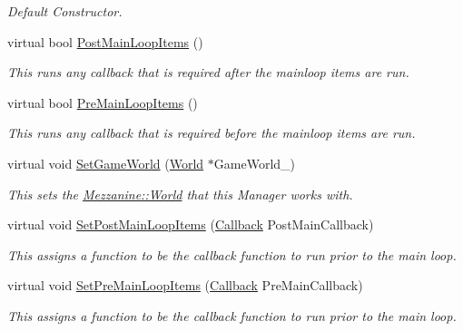 \begin{DoxyCompactItemize}
\begin{DoxyCompactList}\small\item\em Default Constructor. \item\end{DoxyCompactList}\item 
virtual bool \hyperlink{classMezzanine_1_1ManagerBase_a2a1bfb2a137c6013a8a5e5fae4c4bb85}{PostMainLoopItems} ()
\begin{DoxyCompactList}\small\item\em This runs any callback that is required after the mainloop items are run. \item\end{DoxyCompactList}\item 
virtual bool \hyperlink{classMezzanine_1_1ManagerBase_a9e0f19b5472eab47fbcd986656838070}{PreMainLoopItems} ()
\begin{DoxyCompactList}\small\item\em This runs any callback that is required before the mainloop items are run. \item\end{DoxyCompactList}\item 
virtual void \hyperlink{classMezzanine_1_1ManagerBase_acb66b1edbb0f256fb1d4d4d2126f073e}{SetGameWorld} (\hyperlink{classMezzanine_1_1World}{World} $\ast$GameWorld\_\-)
\begin{DoxyCompactList}\small\item\em This sets the \hyperlink{classMezzanine_1_1World}{Mezzanine::World} that this Manager works with. \item\end{DoxyCompactList}\item 
virtual void \hyperlink{classMezzanine_1_1ManagerBase_a4ec52058f4c8a3f1c5fb20230b4fc301}{SetPostMainLoopItems} (\hyperlink{classMezzanine_1_1ManagerBase_ab23a9aa27c4e3cb58d902a149d3c6de2}{Callback} PostMainCallback)
\begin{DoxyCompactList}\small\item\em This assigns a function to be the callback function to run prior to the main loop. \item\end{DoxyCompactList}\item 
virtual void \hyperlink{classMezzanine_1_1ManagerBase_a84dd669c15e9db08c9efbc84c4fa3b0b}{SetPreMainLoopItems} (\hyperlink{classMezzanine_1_1ManagerBase_ab23a9aa27c4e3cb58d902a149d3c6de2}{Callback} PreMainCallback)
\begin{DoxyCompactList}\small\item\em This assigns a function to be the callback function to run prior to the main loop. \item\end{DoxyCompactList}\item 

\end{DoxyCompactItemize}
